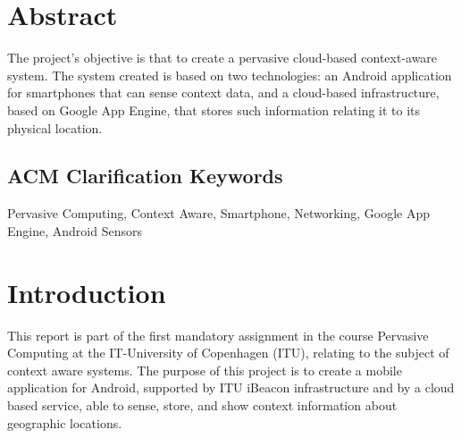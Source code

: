 \section{Abstract}
The project's objective is that to create a pervasive cloud-based context-aware system. 
The system created is based on two technologies: an Android application for smartphones that can sense context data, and a cloud-based infrastructure, based on Google App Engine, that stores such information relating it to its physical location.

\subsection{ACM Clarification Keywords}
Pervasive Computing, Context Aware, Smartphone, Networking, Google App Engine, Android Sensors

\section{Introduction}
This report is part of the first mandatory assignment in the course Pervasive Computing at the IT-University of Copenhagen (ITU), relating to the subject of context aware systems.
 The purpose of this project is to create a mobile application for Android, supported by ITU iBeacon infrastructure and by a  cloud based service, able to sense, store, and show context information about geographic locations. 